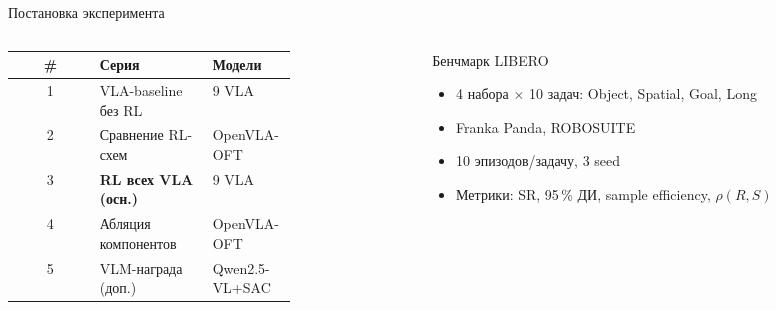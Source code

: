\documentclass[aspectratio=169,13pt]{beamer}
\begin{document}
\begin{frame}{Постановка эксперимента}
  \begin{columns}[T]
    \begin{column}{0.56\textwidth}
      \footnotesize
      \setlength{\tabcolsep}{3pt}
      \begin{tabular}{cp{0.40\linewidth}p{0.30\linewidth}}
        \toprule
        \textbf{\#} & \textbf{Серия} & \textbf{Модели} \\
        \midrule
        1 & VLA-baseline без RL & 9 VLA \\
        2 & Сравнение RL-схем & OpenVLA-OFT \\
        3 & \textbf{RL всех VLA (осн.)} & 9 VLA \\
        4 & Абляция компонентов & OpenVLA-OFT \\
        5 & VLM-награда (доп.) & Qwen2.5-VL+SAC \\
        \bottomrule
      \end{tabular}
    \end{column}
    \begin{column}{0.42\textwidth}
      \begin{block}{Бенчмарк LIBERO}
        \small
        \begin{itemize}\setlength\itemsep{2pt}
          \item 4 набора $\times$ 10 задач: Object, Spatial, Goal, Long
          \item Franka Panda, ROBOSUITE
          \item 10 эпизодов/задачу, 3 seed
          \item Метрики: SR, 95\,\% ДИ, sample efficiency, $\rho(R,S)$
        \end{itemize}
      \end{block}
    \end{column}
  \end{columns}
\end{frame}
\end{document}
